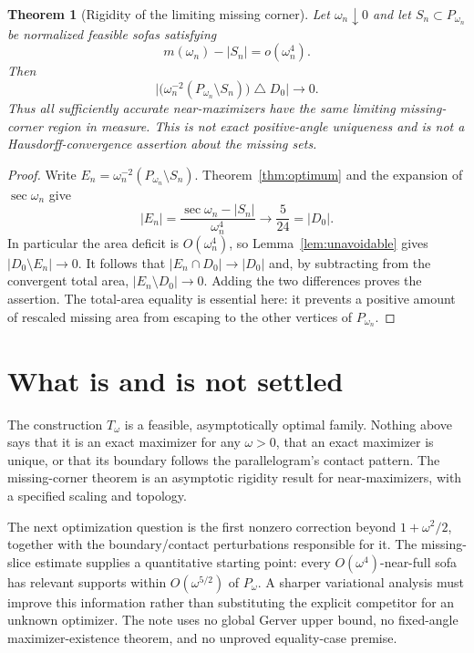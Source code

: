 \documentclass[11pt]{article}
\newtheorem{theorem}{Theorem}[section]
\theoremstyle{remark}\newtheorem{remark}[theorem]{Remark}
\newcommand{\area}[1]{\lvert #1\rvert}
\begin{document}
\begin{theorem}[Rigidity of the limiting missing corner]\label{thm:rigidity}
Let $\omega_n\downarrow0$ and let $S_n\subset P_{\omega_n}$ be normalized feasible sofas satisfying
\[
 m(\omega_n)-\area{S_n}=o(\omega_n^4).
\]
Then
\[
 \boxed{\displaystyle
 \area{\bigl(\omega_n^{-2}(P_{\omega_n}\setminus S_n)\bigr)\mathbin\triangle D_0}\longrightarrow0.}
\]
Thus all sufficiently accurate near-maximizers have the same limiting missing-corner region in measure. This is not exact positive-angle uniqueness and is not a Hausdorff-convergence assertion about the missing sets.
\end{theorem}
\begin{proof}
Write $E_n=\omega_n^{-2}(P_{\omega_n}\setminus S_n)$. Theorem~\ref{thm:optimum} and the expansion of $\sec\omega_n$ give
\[
 \area{E_n}=\frac{\sec\omega_n-\area{S_n}}{\omega_n^4}\longrightarrow\frac5{24}=\area{D_0}.
\]
In particular the area deficit is $O(\omega_n^4)$, so Lemma~\ref{lem:unavoidable} gives $\area{D_0\setminus E_n}\to0$. It follows that $\area{E_n\cap D_0}\to\area{D_0}$ and, by subtracting from the convergent total area, $\area{E_n\setminus D_0}\to0$. Adding the two differences proves the assertion. The total-area equality is essential here: it prevents a positive amount of rescaled missing area from escaping to the other vertices of $P_{\omega_n}$.
\end{proof}

\section{What is and is not settled}
The construction $T_\omega$ is a feasible, asymptotically optimal family. Nothing above says that it is an exact maximizer for any $\omega>0$, that an exact maximizer is unique, or that its boundary follows the parallelogram's contact pattern. The missing-corner theorem is an asymptotic rigidity result for near-maximizers, with a specified scaling and topology.

The next optimization question is the first nonzero correction beyond $1+\omega^2/2$, together with the boundary/contact perturbations responsible for it. The missing-slice estimate supplies a quantitative starting point: every $O(\omega^4)$-near-full sofa has relevant supports within $O(\omega^{5/2})$ of $P_\omega$. A sharper variational analysis must improve this information rather than substituting the explicit competitor for an unknown optimizer. The note uses no global Gerver upper bound, no fixed-angle maximizer-existence theorem, and no unproved equality-case premise.
\end{document}

